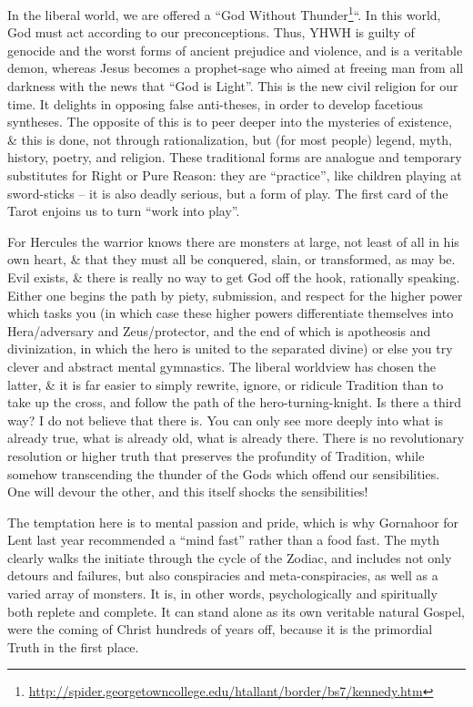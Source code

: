 In the liberal world, we are offered a ``God Without Thunder\footnote{\url{http://spider.georgetowncollege.edu/htallant/border/bs7/kennedy.htm}}``. In this world, God must act according to our preconceptions. Thus, YHWH is guilty of genocide and the worst forms of ancient prejudice and violence, and is a veritable demon, whereas Jesus becomes a prophet-sage who aimed at freeing man from all darkness with the news that ``God is Light''. This is the new civil religion for our time. It delights in opposing false anti-theses, in order to develop facetious syntheses. The opposite of this is to peer deeper into the mysteries of existence, \& this is done, not through rationalization, but (for most people) legend, myth, history, poetry, and religion. These traditional forms are analogue and temporary substitutes for Right or Pure Reason: they are ``practice'', like children playing at sword-sticks -- it is also deadly serious, but a form of play. The first card of the Tarot enjoins us to turn ``work into play''.

For Hercules the warrior knows there are monsters at large, not least of all in his own heart, \& that they must all be conquered, slain, or transformed, as may be. Evil exists, \& there is really no way to get God off the hook, rationally speaking. Either one begins the path by piety, submission, and respect for the higher power which tasks you (in which case these higher powers differentiate themselves into Hera/adversary and Zeus/protector, and the end of which is apotheosis and divinization, in which the hero is united to the separated divine) or else you try clever and abstract mental gymnastics. The liberal worldview has chosen the latter, \& it is far easier to simply rewrite, ignore, or ridicule Tradition than to take up the cross, and follow the path of the hero-turning-knight. Is there a third way? I do not believe that there is. You can only see more deeply into what is already true, what is already old, what is already there. There is no revolutionary resolution or higher truth that preserves the profundity of Tradition, while somehow transcending the thunder of the Gods which offend our sensibilities. One will devour the other, and this itself shocks the sensibilities!

The temptation here is to mental passion and pride, which is why Gornahoor for Lent last year recommended a ``mind fast'' rather than a food fast. The myth clearly walks the initiate through the cycle of the Zodiac, and includes not only detours and failures, but also conspiracies and meta-conspiracies, as well as a varied array of monsters. It is, in other words, psychologically and spiritually both replete and complete. It can stand alone as its own veritable natural Gospel, were the coming of Christ hundreds of years off, because it is the primordial Truth in the first place.

